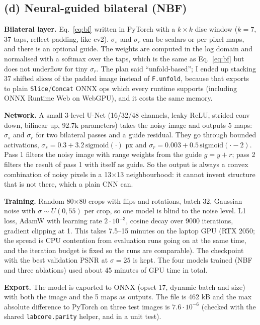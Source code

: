 \documentclass[11pt,a4paper]{article}
\begin{document}
\subsection{(d) Neural-guided bilateral (NBF)}

\textbf{Bilateral layer.} Eq.~\ref{eq:bf} written in PyTorch with a $k\times k$ disc window ($k=7$,
37 taps, reflect padding, like cv2). $\sigma_s$ and $\sigma_r$ can be scalars or per-pixel maps, and
there is an optional guide. The weights are computed in the log domain and normalised with a softmax over
the taps, which is the same as Eq.~\ref{eq:bf} but does not underflow for tiny $\sigma_r$. The plan said
``unfold-based''; I ended up stacking 37 shifted slices of the padded image instead of
\texttt{F.unfold}, because that exports to plain \texttt{Slice}/\texttt{Concat} ONNX ops which every
runtime supports (including ONNX Runtime Web on WebGPU), and it costs the same memory.

\textbf{Network.} A small 3-level U-Net (16/32/48 channels, leaky ReLU, strided conv down, bilinear up,
92.7k parameters) takes the noisy image and outputs 5 maps: $\sigma_s$ and $\sigma_r$ for two bilateral
passes and a guide residual. They go through bounded activations,
$\sigma_s = 0.3 + 3.2\,\mathrm{sigmoid}(\cdot)$ px and $\sigma_r = 0.003+0.5\,\mathrm{sigmoid}(\cdot-2)$.
Pass 1 filters the noisy image with range weights from the guide $g=y+r$; pass 2 filters the result of
pass 1 with itself as guide. So the output is always a convex combination of noisy pixels in a 13$\times$13
neighbourhood: it cannot invent structure that is not there, which a plain CNN can.

\textbf{Training.} Random 80$\times$80 crops with flips and rotations, batch 32, Gaussian noise with
$\sigma\sim U(0,55)$ per crop, so one model is blind to the noise level. L1 loss, AdamW with learning rate
$2\cdot10^{-3}$, cosine decay over 9000 iterations, gradient clipping at 1. This takes 7.5--15 minutes on the
laptop GPU (RTX 2050; the spread is CPU contention from evaluation runs going on at the same time, and the
iteration budget is fixed so the runs are comparable). The checkpoint with the best validation PSNR at
$\sigma=25$ is kept. The four models trained (NBF and three ablations) used about 45 minutes of GPU time
in total.

\textbf{Export.} The model is exported to ONNX (opset 17, dynamic batch and size) with both the image and
the 5 maps as outputs. The file is 462 kB and the max absolute difference to PyTorch on three test images is
$7.6\cdot10^{-6}$ (checked with the shared \texttt{labcore.parity} helper, and in a unit test).
\end{document}
